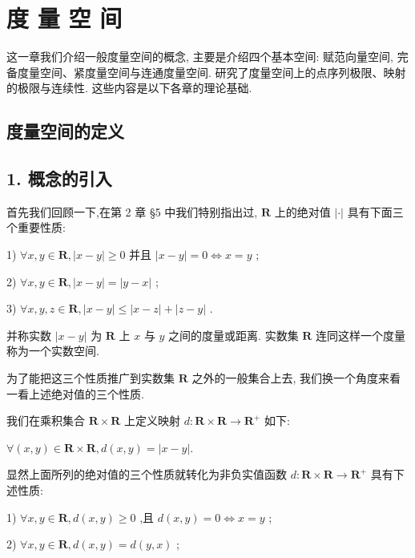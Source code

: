 \chapter{度 量 空 间}

这一章我们介绍一般度量空间的概念, 主要是介绍四个基本空间: 赋范向量空间, 完备度量空间、紧度量空间与连通度量空间. 研究了度量空间上的点序列极限、映射的极限与连续性. 这些内容是以下各章的理论基础.

\section{度量空间的定义}

\section*{1. 概念的引入}

首先我们回顾一下,在第 2 章 §5 中我们特别指出过, $\mathbf{R}$ 上的绝对值 $\left| \cdot \right|$ 具有下面三个重要性质:

1) $\forall x,y \in  \mathbf{R},\left| {x - y}\right|  \geq  0$ 并且 $\left| {x - y}\right|  = 0 \Leftrightarrow  x = y$ ;

2) $\forall x,y \in  \mathbf{R},\left| {x - y}\right|  = \left| {y - x}\right|$ ;

3) $\forall x,y,z \in  \mathbf{R},\left| {x - y}\right|  \leq  \left| {x - z}\right|  + \left| {z - y}\right|$ .

并称实数 $\left| {x - y}\right|$ 为 $\mathbf{R}$ 上 $x$ 与 $y$ 之间的度量或距离. 实数集 $\mathbf{R}$ 连同这样一个度量称为一个实数空间.

为了能把这三个性质推广到实数集 $\mathbf{R}$ 之外的一般集合上去, 我们换一个角度来看一看上述绝对值的三个性质.

我们在乘积集合 $\mathbf{R} \times  \mathbf{R}$ 上定义映射 $d : \mathbf{R} \times  \mathbf{R} \rightarrow  {\mathbf{R}}^{ + }$ 如下:

$\forall \left( {x,y}\right)  \in  \mathbf{R} \times  \mathbf{R},d\left( {x,y}\right)  = \left| {x - y}\right| .$

显然上面所列的绝对值的三个性质就转化为非负实值函数 $d : \mathbf{R} \times  \mathbf{R} \rightarrow  {\mathbf{R}}^{ + }$ 具有下述性质:

1) $\forall x,y \in  \mathbf{R},d\left( {x,y}\right)  \geq  0$ ,且 $d\left( {x,y}\right)  = 0 \Leftrightarrow  x = y$ ;

2) $\forall x,y \in  \mathbf{R},d\left( {x,y}\right)  = d\left( {y,x}\right)$ ;

